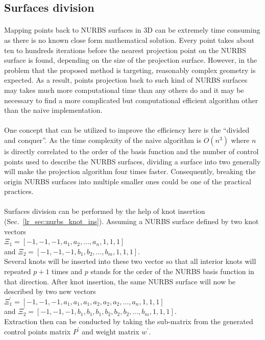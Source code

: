 \subsection{Surfaces division}
\label{oct_sc:surface_division}
\paragraph{}
Mapping points back to NURBS surfaces in 3D can be extremely time consuming as there is no known close form mathematical solution.
Every point takes about ten to hundreds iterations before the nearest projection point on the NURBS surface is found, depending on the size of the projection surface.
However, in the problem that the proposed method is targeting, reasonably complex geometry is expected.
As a result, points projection back to such kind of NURBS surfaces may takes much more computational time than any others do and it may be necessary to find a more complicated but computational efficient algorithm other than the naive implementation.

\paragraph{}
One concept that can be utilized to improve the efficiency here is the ``divided and conquer''.
As the time complexity of the naive algorithm is $O(n^3)$ where $n$ is directly correlated to the order of the basis function and the number of control points used to describe the NURBS surfaces, dividing a surface into two generally will make the projection algorithm four times faster.
Consequently, breaking the origin NURBS surfaces into multiple smaller ones could be one of the practical practices.

\paragraph{}
Surfaces division can be performed by the help of knot insertion (Sec.~\ref{lr_sec:nurbs_knot_ins}).
Assuming a NURBS surface defined by two knot vectors\\
$
\Xi_1 = [-1, -1, -1, a_1, a_2, \dots, a_n , 1, 1, 1]
$\\
and
$
\Xi_2 = [-1, -1, -1, b_1, b_2, \dots, b_m, 1, 1, 1]
$.\\
Several knots will be inserted into these two vector so that all interior knots will repeated $p+1$ times and $p$ stands for the order of the NURBS basis function in that direction.
After knot insertion, the same NURBS surface will now be described by two new vectors\\
$
\Xi_1^\prime = [-1, -1, -1, a_1, a_1, a_1, a_2, a_2, a_2, \dots, a_n , 1, 1, 1]
$\\
and
$
\Xi_2^\prime = [-1, -1, -1, b_1, b_1, b_1, b_2, b_2, b_2, \dots, b_m, 1, 1, 1]
$.\\
Extraction then can be conducted by taking the sub-matrix from the generated control points matrix $P^\prime$ and weight matrix $w^\prime$.

